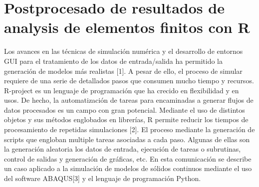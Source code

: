 \chapter{Postprocesado de resultados de analysis de elementos finitos con R}




Los avances en las técnicas de simulación numérica y el desarrollo de entornos GUI para el tratamiento de los datos de entrada/salida ha permitido la generación de modelos más realistas [1]. A pesar de ello, el proceso de simular requiere de una serie de detallados pasos que consumen mucho tiempo y recursos. R-project es un lenguaje de programación que ha crecido en flexibilidad y en usos. De hecho, la automatización de tareas para encaminadas a generar flujos de datos procesados es un campo con gran potencial.
Mediante el uso de distintos objetos y sus métodos englobados en librerías, R permite reducir los tiempos de procesamiento de repetidas simulaciones [2]. El proceso mediante la generación de scripts que engloban multiple tareas asociadas a cada paso. Algunas de ellas son la generación aleatoria los datos de entrada, ejecución de tareas o subrutinas, control de salidas y generación de gráficas, etc. En esta comunicación se describe un caso aplicado a la simulación de modelos de sólidos continuos mediante el uso del software ABAQUS[3] y el lenguaje de programación Python.

%

%
